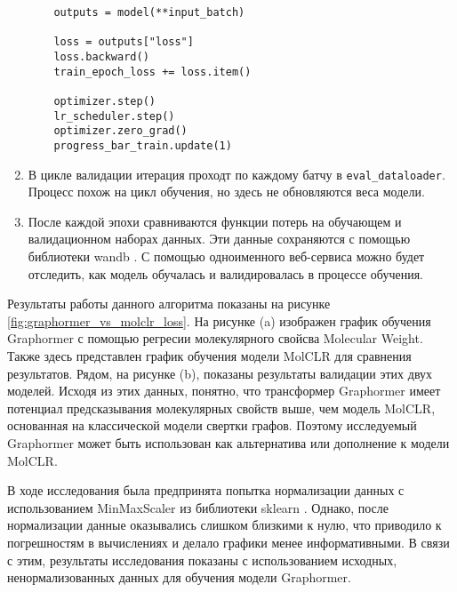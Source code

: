 \begin{enumerate}
\begin{lstlisting}
    outputs = model(**input_batch)
    
    loss = outputs["loss"]
    loss.backward()
    train_epoch_loss += loss.item()
    
    optimizer.step()
    lr_scheduler.step()
    optimizer.zero_grad()
    progress_bar_train.update(1)
\end{lstlisting}

\item В цикле валидации итерация проходт по каждому батчу в \texttt{eval\_dataloader}. Процесс похож на цикл обучения, но здесь не обновляются веса модели.

\item После каждой эпохи сравниваются функции потерь на обучающем и валидационном наборах данных. Эти данные сохраняются с помощью  библиотеки wandb \cite{wandb}. С помощью одноименного веб-сервиса можно будет отследить, как модель обучалась и валидировалась в процессе обучения.
\end{enumerate}

Результаты работы данного алгоритма показаны на рисунке \ref{fig:graphormer_vs_molclr_loss}. На рисунке (a) изображен график обучения Graphormer с помощью регресии молекулярного свойсва Molecular Weight. Также здесь представлен график обучения модели MolCLR для сравнения результатов. Рядом, на рисунке (b), показаны результаты валидации этих двух моделей. Исходя из этих данных, понятно, что трансформер Graphormer имеет потенциал предсказывания молекулярных свойств выше, чем модель MolCLR, основанная на классической модели свертки графов. Поэтому исследуемый Graphormer может быть использован как альтернатива или дополнение к модели MolCLR.


В ходе исследования была предпринята попытка нормализации данных с использованием MinMaxScaler из библиотеки sklearn \cite{sklearn}. Однако, после нормализации данные оказывались слишком близкими к нулю, что приводило к погрешностям в вычислениях и делало графики менее информативными. В связи с этим, результаты исследования показаны с использованием исходных, ненормализованных данных для обучения модели Graphormer.



